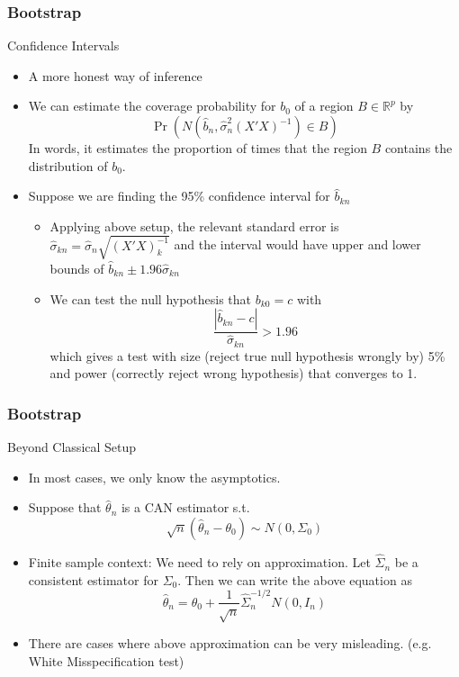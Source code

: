 \documentclass{beamer}
\begin{document}
\begin{frame}
\frametitle{Bootstrap}
Confidence Intervals
\begin{itemize}
\item A more honest way of inference
\item We can estimate the coverage probability for $b_0$ of a region $B\in\mathbb{R}^p$ by
\[
\Pr(N(\hat{b}_n, \hat{\sigma}_n^2(X'X)^{-1})\in B)
\]
In words, it estimates the proportion of times that the region $B$ contains the distribution of $b_0$. 
\item Suppose we are finding the 95\% confidence interval for $\hat{b}_{kn}$
\begin{itemize}
\item Applying above setup, the relevant standard error is $\hat{\sigma}_{kn}=\hat{\sigma}_n\sqrt{(X'X)^{-1}_{k}}$ and the interval would have upper and lower bounds of $\hat{b}_{kn}\pm 1.96\hat{\sigma}_{kn}$
\item We can test the null hypothesis that $b_{k0}=c$ with 
\small{\[
\frac{|\hat{b}_{kn}-c|}{\hat{\sigma}_{kn}}>1.96
\]}\normalsize
which gives a test with size (reject true null hypothesis wrongly by) 5\% and power (correctly reject wrong hypothesis) that converges to 1.
\end{itemize}
\end{itemize}
\end{frame}

\begin{frame}
\frametitle{Bootstrap}
Beyond Classical Setup
\begin{itemize}
\item In most cases, we only know the asymptotics.
\item Suppose that $\hat{\theta}_n$ is a CAN estimator s.t.
\[
\sqrt{n}(\hat{\theta}_n-\theta_0) \sim N(0,\Sigma_0)
\]
\item Finite sample context: We need to rely on approximation.  Let $\widehat{\Sigma}_n$ be a consistent estimator for $\Sigma_0$. Then we can write the above equation as
\[
\hat{\theta}_n = \theta_0+\frac{1}{\sqrt{n}}\widehat{\Sigma}_n^{-1/2}N(0, I_n)
\]
\item There are cases where above approximation can be very misleading. (e.g. White Misspecification test)
\end{itemize}
\end{frame}
\end{document}
